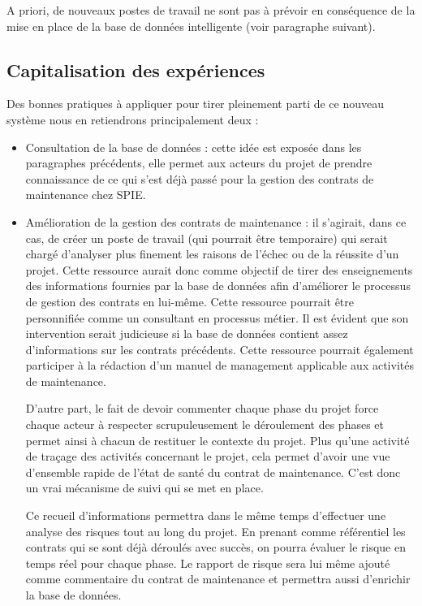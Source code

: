 A priori, de nouveaux postes de travail ne sont pas à prévoir en conséquence de la mise en place de la \og base de données intelligente \fg (voir paragraphe suivant).

\subsection{Capitalisation des expériences}

Des bonnes pratiques à appliquer pour tirer pleinement parti de ce nouveau système nous en retiendrons principalement deux :

\begin{itemize}
\item Consultation de la base de données : cette idée est exposée dans les paragraphes précédents, elle permet aux acteurs du projet de prendre connaissance de ce qui s'est déjà passé pour la gestion des contrats de maintenance chez SPIE.
\item Amélioration de la gestion des contrats de maintenance : il s'agirait, dans ce cas, de créer un poste de travail (qui pourrait être temporaire) qui serait chargé d'analyser plus finement les raisons de l'échec ou de la réussite d'un projet. Cette ressource aurait donc comme objectif de tirer des enseignements des informations fournies par la base de données afin d'améliorer le processus de gestion des contrats en lui-même. Cette ressource pourrait être personnifiée comme un consultant en processus métier. Il est évident que son intervention serait judicieuse si la base de données contient assez d'informations sur les contrats précédents. Cette ressource pourrait également participer à la rédaction d'un manuel de management applicable aux activités de maintenance.

\medskip

D'autre part, le fait de devoir commenter chaque phase du projet force chaque acteur à respecter scrupuleusement le déroulement des phases et permet ainsi à chacun de restituer le contexte du projet. Plus qu'une activité de traçage des activités concernant le projet, cela permet d'avoir une vue d'ensemble rapide de l'état de santé du contrat de maintenance. C'est donc un vrai mécanisme de suivi qui se met en place.

Ce recueil d'informations permettra dans le même temps d'effectuer une analyse des risques tout au long du projet. En prenant comme référentiel les contrats qui se sont déjà déroulés avec succès, on pourra évaluer le risque en temps réel pour chaque phase. Le rapport de risque sera lui même ajouté comme \og commentaire \fg du contrat de maintenance et permettra aussi d'enrichir la base de données.

\end{itemize}